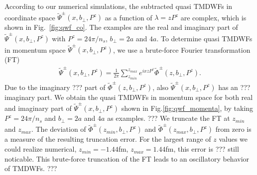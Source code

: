 \documentclass[prd,aps,twocolumn,preprintnumbers, showpacs, nofootinbib,superscriptaddress,notitlepage]{revtex4-1}
\newcommand{\red}[1]{\textcolor{red}{#1}} %
\newcommand\bl{\color{blue}}
\begin{document}
According to our numerical simulations, the subtracted quasi TMDWFs in coordinate space $\tilde{\Psi}^{\pm}(x,b_{\perp},P^z)$ as a function of $\lambda=zP^z$ are complex, which {\bl is} shown in Fig.~\ref{fig:qwf_co}. The examples are {\bl the} real and imaginary part of $\tilde{\Psi}^{\pm}(x,b_{\perp},P^z)$ with $P^z=24\pi/n_s$, $b_{\perp}=2a$ and $4a$. %
To determine quasi TMDWFs in momentum space $\tilde{\Psi}^{\pm}(x,b_{\perp},P^z)$, {\bl we use a brute-force} Fourier transformation (FT)
\begin{align}
\tilde{\Psi}^{\pm}(x,b_{\perp},P^z)=\frac{1}{2\pi}\sum_{z_{min}}^{z_{max}}e^{ixzP^z}\tilde{\Phi}^{\pm}(z,b_{\perp},P^z).
\label{eq:FT}
\end{align}
Due to the imaginary {\bl ??? part of $\tilde{\Phi}^{\pm}(z,b_{\perp},P^z)$, also $\tilde{\Psi}^{\pm}(x,b_{\perp},P^z)$ has an ???}  imaginary part. We obtain the quasi TMDWFs in {\bl  momentum space} for both real and imaginary part of $\tilde{\Psi}^{\pm}(x,b_{\perp},P^z)$ shown in Fig.\ref{fig:qwf_momenta}, by taking $P^z=24\pi/n_s$ and $b_{\perp}=2a$ and $4a$ as examples. {\bl ??? We truncate the FT at $z_{min}$ and $z_{max}$. The deviation of
  $\tilde{\Phi}^{\pm}(z_{min},b_{\perp},P^z)$ and $\tilde{\Phi}^{\pm}(z_{max},b_{\perp},P^z)$ from zero is a measure of the resulting truncation error. For the largest range of $z$ values we could realize numerical,  $z_{min}=-1.44$fm, $z_{max}=1.44$fm, this error is ??? still noticable. This brute-force truncation of the FT leads to an oscillatory behavior of TMDWFs. ???}%
\newpage
\end{document}

